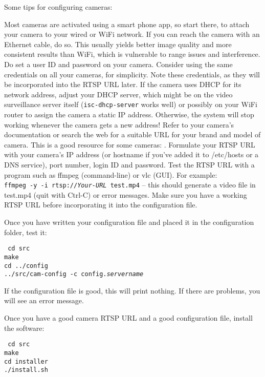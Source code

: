     Some tips for configuring cameras:

    \BE
    \I Most cameras are activated using a smart phone app, so start there,
       to attach your camera to your wired or WiFi network.
    \I If you can reach the camera with an Ethernet cable, do so.
       This usually yields better image quality and more consistent
       results than WiFi, which is vulnerable to range issues and
       interference.
    \I Do set a user ID and password on your camera.  Consider using the
       same credentials on all your cameras, for simplicity.  Note these
       credentials, as they will be incorporated into the RTSP URL
       later.
    \I If the camera uses DHCP for its network address, adjust your
       DHCP server, which might be on the video surveillance server itself
       (\texttt{isc-dhcp-server} works well) or possibly on your WiFi
       router to assign the camera a static IP address. Otherwise, the
       system will stop working whenever the camera gets a new address!
    \I Refer to your camera's documentation or search the web for a
       suitable URL for your brand and model of camera.  This is a good
       resource for some cameras: .
    \I Formulate your RTSP URL with your camera's IP address (or hostname
       if you've added it to /etc/hosts or a DNS service), port number,
       login ID and password.
    \I Test the RTSP URL with a program such as ffmpeg (command-line)
       or vlc (GUI).  For example:\\
       \texttt{ffmpeg -y -i rtsp://\emph{Your-URL} test.mp4} -- this
       should generate a video file in test.mp4 (quit with Ctrl-C) or
       error messages.
    \I Make sure you have a working RTSP URL before incorporating it
       into the configuration file.
    \EE

    Once you have written your configuration file and placed it in the
    configuration folder, test it:

    \texttt{%
    cd src\\
    make\\
    cd ../config\\
    ../src/cam-config -c config.\emph{servername}}

    If the configuration file is good, this will print nothing.
    If there are problems, you will see an error message.

    Once you have a good camera RTSP URL and a good configuration file,
    install the software:

    \texttt{%
    cd src\\
    make\\
    cd installer\\
    ./install.sh}

